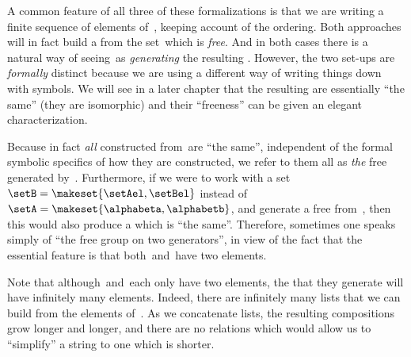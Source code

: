 A common feature of all three of these formalizations is that we are writing a finite sequence of elements of~\setA, keeping account of the ordering.
Both approaches will in fact build a  from the set~\setA which is \emph{free}.
And in both cases there is a natural way of seeing~\setA as \emph{generating} the resulting .
However, the two set-ups are \emph{formally} distinct because we are using a different way of writing things down with symbols.
We will see in a later chapter that the resulting  are essentially ``the same'' (they are isomorphic) and their ``freeness'' can be given an elegant characterization.

Because in fact \emph{all}  constructed from~\setA are ``the same'', independent of the formal symbolic specifics of how they are constructed, we refer to them all as \emph{the} free  generated by~\setA.
Furthermore, if we were to work with a set~$\setB = \makeset{ \setAel, \setBel }$ instead of~$\setA = \makeset{ \alphabeta, \alphabetb}$, and generate a free  from~\setB, then this would also produce a  which is ``the same''.
Therefore, sometimes one speaks simply of ``the free group on two generators'', in view of the fact that the essential feature is that both~\setA and~\setB have two elements.

Note that although~\setA and~\setB each only have two elements, the  that they generate will have infinitely many elements.
Indeed, there are infinitely many lists that we can build from the elements of~\setA.
As we concatenate lists, the resulting compositions grow longer and longer, and there are no relations which would allow us to ``simplify'' a string to one which is shorter.

